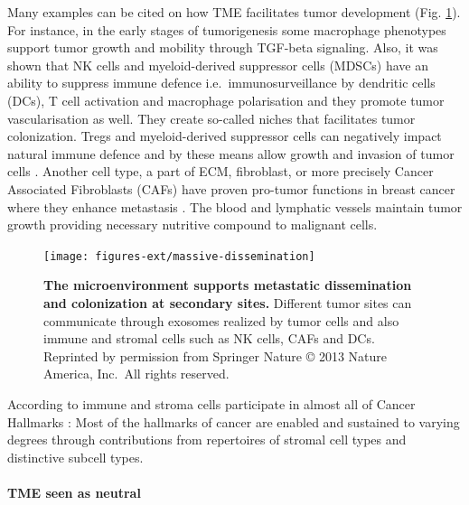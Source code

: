 \documentclass[12pt,]{book}
\let\oldparagraph\paragraph
\renewcommand{\paragraph}[1]{\oldparagraph{#1}\mbox{}}
\theoremstyle{definition}
\theoremstyle{definition}
\theoremstyle{definition}
\theoremstyle{remark}
\begin{document}
Many examples can be cited on how TME facilitates tumor development
(Fig. \ref{fig:met-dis}). For instance, in the early stages of
tumorigenesis some macrophage phenotypes support tumor growth and
mobility through TGF-beta signaling. Also, it was shown that NK cells
and myeloid-derived suppressor cells (MDSCs) have an ability to suppress
immune defence i.e.~immunosurveillance by dendritic cells (DCs), T cell
activation and macrophage polarisation and they promote tumor
vascularisation as well. \citep{Talmadge2013, Gabrilovich2012} They
create so-called niches that facilitates tumor colonization. Tregs and
myeloid-derived suppressor cells can negatively impact natural immune
defence and by these means allow growth and invasion of tumor cells
\citep{Taube2017a}. Another cell type, a part of ECM, fibroblast, or
more precisely Cancer Associated Fibroblasts (CAFs) have proven
pro-tumor functions in breast cancer where they enhance metastasis
\citep{Dumont2013}. The blood and lymphatic vessels maintain tumor
growth providing necessary nutritive compound to malignant cells.

\begin{figure}

{\centering \texttt{[image: figures-ext/massive-dissemination]} 

}

\caption{\textbf{The microenvironment supports metastatic
dissemination and colonization at secondary sites.} Different tumor
sites can communicate through exosomes realized by tumor cells and also
immune and stromal cells such as NK cells, CAFs and DCs. Reprinted by
permission from Springer Nature \citep{Quail2013} © 2013 Nature America,
Inc.~All rights reserved.}\label{fig:met-dis}
\end{figure}








According to \citep{Hanahan2012} immune and stroma cells participate in
almost all of Cancer Hallmarks \citep{Hanahan2000, Hanahan2012} : Most
of the hallmarks of cancer are enabled and sustained to varying degrees
through contributions from repertoires of stromal cell types and
distinctive subcell types.

\hypertarget{tme-seen-as-neutral}{%
\paragraph{TME seen as neutral}\label{tme-seen-as-neutral}}
\end{document}

